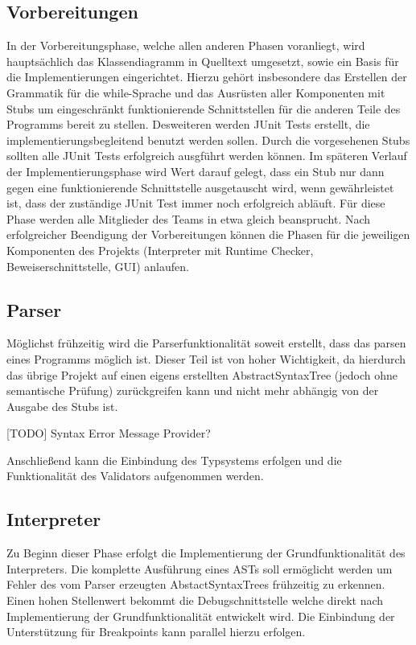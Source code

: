 \subsection{Vorbereitungen}
In der Vorbereitungsphase, welche allen anderen Phasen voranliegt, wird hauptsächlich das Klassendiagramm in Quelltext umgesetzt, sowie ein Basis für die Implementierungen eingerichtet. Hierzu gehört insbesondere das Erstellen der Grammatik für die while-Sprache und das Ausrüsten aller Komponenten mit Stubs um eingeschränkt funktionierende Schnittstellen für die anderen Teile des Programms bereit zu stellen. Desweiteren werden JUnit Tests erstellt, die implementierungsbegleitend benutzt werden sollen. Durch die vorgesehenen Stubs sollten alle JUnit Tests erfolgreich ausgführt werden können. Im späteren Verlauf der Implementierungsphase wird Wert darauf gelegt, dass ein Stub nur dann gegen eine funktionierende Schnittstelle ausgetauscht wird, wenn gewährleistet ist, dass der zuständige JUnit Test immer noch erfolgreich abläuft. Für diese Phase werden alle Mitglieder des Teams in etwa gleich beansprucht. Nach erfolgreicher Beendigung der Vorbereitungen können die Phasen für die jeweiligen Komponenten des Projekts (Interpreter mit Runtime Checker, Beweiserschnittstelle, GUI) anlaufen.

\subsection{Parser}
Möglichst frühzeitig wird die Parserfunktionalität soweit erstellt, dass das parsen eines Programms möglich ist. Dieser Teil ist von hoher Wichtigkeit, da hierdurch das übrige Projekt auf einen eigens erstellten AbstractSyntaxTree (jedoch ohne semantische Prüfung) zurückgreifen kann und nicht mehr abhängig von der Ausgabe des Stubs ist.

[TODO] Syntax Error Message Provider?

Anschließend kann die Einbindung des Typsystems erfolgen und die Funktionalität des Validators aufgenommen werden.

\subsection{Interpreter}
Zu Beginn dieser Phase erfolgt die Implementierung der Grundfunktionalität des Interpreters. Die komplette Ausführung eines ASTs soll  ermöglicht werden um Fehler des vom Parser erzeugten AbstactSyntaxTrees frühzeitig zu erkennen. Einen hohen Stellenwert bekommt die Debugschnittstelle welche direkt nach Implementierung der Grundfunktionalität entwickelt wird. Die Einbindung der Unterstützung für Breakpoints kann parallel hierzu erfolgen.

